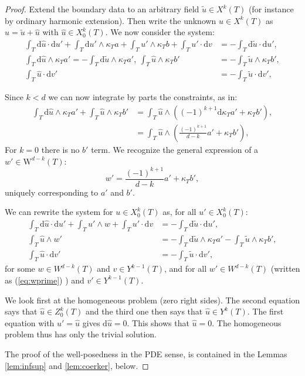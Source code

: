 \documentclass[10pt,a4paper]{article}
\newcommand{\rmd}{\mathrm{d}}
\newcommand{\rmW}{\mathrm{W}}
\newcommand{\Whitney}{\rmW}
\theoremstyle{remark}
\theoremstyle{definition}
\numberwithin{equation}{section}
\begin{document}
\begin{proof}
Extend the boundary data to an arbitrary field $\tilde u \in X^k(T)$ (for instance by ordinary harmonic extension). Then write the unknown $u \in X^k(T)$ as $u = \tilde u + \hat u$ with $\hat u \in X^k_0(T)$. We now consider the system:
\begin{align}
  \int_T \rmd \hat u \cdot \rmd u' + \int_T \rmd u' \wedge \kappa_T a + \int_T u' \wedge \kappa_T b + \int_T u' \cdot \rmd v & = - \int_T \rmd \tilde u \cdot \rmd u',\\
  \int_T \rmd \hat u \wedge \kappa_T a' = - \int_T \rmd \tilde u \wedge \kappa_T a'  ,\ \int_T \hat u \wedge \kappa_T b' & = - \int_T \tilde u \wedge \kappa_T b' ,\\
  \int_T \hat u \cdot \rmd v' & =  - \int_T \tilde u \cdot \rmd v' ,
\end{align}


Since $k < d$ we can now integrate by parts the constraints, as in:
\begin{align}
\int_T \rmd \hat u \wedge \kappa_T a' + \int_T \hat u \wedge \kappa_T b' & = \int_T \hat u \wedge ( (-1)^{k+1} \rmd \kappa_T a' + \kappa_T b'),\\
&=  \int_T \hat u \wedge (\frac{(-1)^{k+1}}{d-k} a' + \kappa_T b') ,
\end{align}
For $k = 0$ there is no $b'$ term. %
We recognize the general expression of a $w' \in \Whitney^{d-k}(T)$:
\begin{equation}\label{eq:wprime}
  w' = \frac{(-1)^{k+1}}{d-k} a' + \kappa_T b',
\end{equation}
uniquely corresponding to $a'$ and $b'$.

We can rewrite the system for  $u \in X^k_0(T)$ as, for all $u' \in X^k_0(T)$:
\begin{align}
  \int_T \rmd \hat u \cdot \rmd u' + \int_T u' \wedge w + \int_T u' \cdot \rmd v & = - \int_T \rmd \tilde u \cdot \rmd u',\\
  \int_T  \hat u \wedge w' & = - \int_T \rmd \tilde u \wedge \kappa_T a' - \int_T \tilde u \wedge \kappa_T b', \\
  \int_T \hat u \cdot \rmd v' & =  - \int_T \tilde u \cdot \rmd v' ,
\end{align}
for some $w \in W^{d-k}(T)$ and $v \in Y^{k-1}(T)$, and for all $w' \in W^{d-k}(T)$ (written as (\ref{eq:wprime}) ) and $v' \in Y^{k-1}(T)$.


We look first at the homogeneous problem (zero right sides). The second equation says that $\hat u \in Z^k_0(T)$ and the third one then says that $\hat u\in Y^k(T)$. The first equation with $u' = \hat u$ gives $\rmd \hat u =0$. This shows that $\hat u = 0$. The homogeneous problem thus has only the trivial solution.

The proof of the well-posedness in the PDE sense, is contained in the Lemmas \ref{lem:infsup} and \ref{lem:coerker}, below.
\end{proof}
\end{document}
